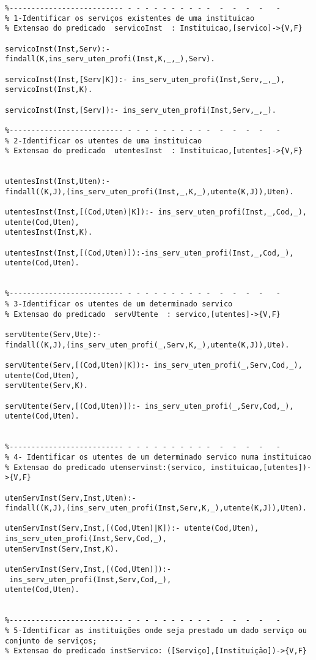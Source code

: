 \documentclass[pdftex,12pt,a4paper]{report}
\begin{document}
\begin{appendices}
\begin{Verbatim}
%-------------------------- - - - - - - - - - -  -  -  -  -   -         
% 1-Identificar os serviços existentes de uma instituicao
% Extensao do predicado  servicoInst  : Instituicao,[servico]->{V,F}

servicoInst(Inst,Serv):-
findall(K,ins_serv_uten_profi(Inst,K,_,_),Serv).      

servicoInst(Inst,[Serv|K]):- ins_serv_uten_profi(Inst,Serv,_,_),
servicoInst(Inst,K).

servicoInst(Inst,[Serv]):- ins_serv_uten_profi(Inst,Serv,_,_).

%-------------------------- - - - - - - - - - -  -  -  -  -   -         
% 2-Identificar os utentes de uma instituicao
% Extensao do predicado  utentesInst  : Instituicao,[utentes]->{V,F}


utentesInst(Inst,Uten):-
findall((K,J),(ins_serv_uten_profi(Inst,_,K,_),utente(K,J)),Uten).      

utentesInst(Inst,[(Cod,Uten)|K]):- ins_serv_uten_profi(Inst,_,Cod,_),
utente(Cod,Uten),
utentesInst(Inst,K).

utentesInst(Inst,[(Cod,Uten)]):-ins_serv_uten_profi(Inst,_,Cod,_),
utente(Cod,Uten).


%-------------------------- - - - - - - - - - -  -  -  -  -   -         
% 3-Identificar os utentes de um determinado servico
% Extensao do predicado  servUtente  : servico,[utentes]->{V,F}

servUtente(Serv,Ute):-
findall((K,J),(ins_serv_uten_profi(_,Serv,K,_),utente(K,J)),Ute).

servUtente(Serv,[(Cod,Uten)|K]):- ins_serv_uten_profi(_,Serv,Cod,_),
utente(Cod,Uten), 
servUtente(Serv,K).

servUtente(Serv,[(Cod,Uten)]):- ins_serv_uten_profi(_,Serv,Cod,_),
utente(Cod,Uten).


%-------------------------- - - - - - - - - - -  -  -  -  -   -
% 4- Identificar os utentes de um determinado servico numa instituicao
% Extensao do predicado utenservinst:(servico, instituicao,[utentes])->{V,F}

utenServInst(Serv,Inst,Uten):- 
findall((K,J),(ins_serv_uten_profi(Inst,Serv,K,_),utente(K,J)),Uten). 

utenServInst(Serv,Inst,[(Cod,Uten)|K]):- utente(Cod,Uten),
ins_serv_uten_profi(Inst,Serv,Cod,_),
utenServInst(Serv,Inst,K).

utenServInst(Serv,Inst,[(Cod,Uten)]):-
 ins_serv_uten_profi(Inst,Serv,Cod,_),
utente(Cod,Uten).


%-------------------------- - - - - - - - - - -  -  -  -  -   -
% 5-Identificar as instituições onde seja prestado um dado serviço ou conjunto de serviços;
% Extensao do predicado instServico: ([Serviço],[Instituição])->{V,F}    


\end{Verbatim}
\end{appendices}
\end{document}
